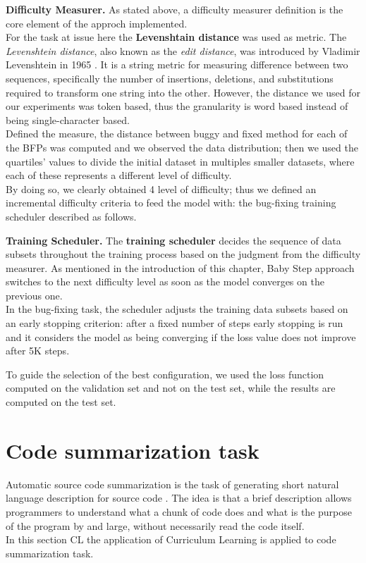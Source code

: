 \textbf{Difficulty Measurer.} As stated above, a difficulty measurer definition is the core element of the approch implemented.\\
For the task at issue here the \textbf{Levenshtain distance} was used as metric. The \textit{Levenshtein distance}, also known as the \textit{edit distance}, 
was introduced by Vladimir Levenshtein in 1965 \cite{Levenshtein_SPD66}. It is a string metric for measuring difference between two sequences, specifically the number of insertions, deletions, and substitutions
required to transform one string into the other. However, the distance we used for our experiments was token based, thus the granularity is word based instead of being single-character based.\\
Defined the measure, the distance between buggy and fixed method for each of the BFPs was computed and we observed the data distribution; then we used the quartiles' values to divide the initial dataset in multiples
smaller datasets, where each of these represents a different level of difficulty.\\
By doing so, we clearly obtained 4 level of difficulty; thus we defined an incremental difficulty criteria to feed the model with: 
the bug-fixing training scheduler described as follows.


\textbf{Training Scheduler.} The \textbf{training scheduler} decides the sequence of data subsets throughout the training process based
on the judgment from the difficulty measurer. As mentioned in the introduction of this chapter, Baby Step approach switches to the next difficulty level
as soon as the model converges on the previous one.\\ 
In the bug-fixing task, the scheduler adjusts
the training data subsets based on an early stopping criterion: after a fixed number of steps
early stopping is run and it considers the model as being converging if the loss value
does not improve after 5K steps.

To guide the selection of the best configuration, we used the loss function computed on the validation set
and not on the test set, while the results are computed on the test set.

\section{Code summarization task}
Automatic source code summarization is the task of generating short natural language description 
for source code \cite{Leclair2020}. The idea is that a brief description allows programmers to understand
what a chunk of code does and what is the purpose of the program by and large, without necessarily read the code 
itself.\\
In this section CL the application of Curriculum Learning is applied to code summarization task.

